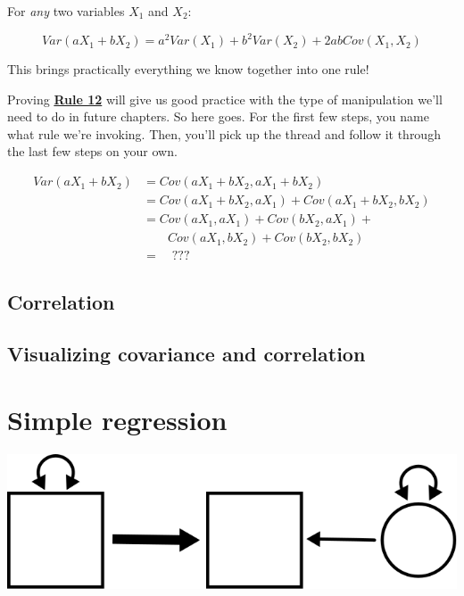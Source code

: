 \documentclass[
]{book}
\begin{document}
For \emph{any} two variables \(X_{1}\) and \(X_{2}\):

\[
Var(aX_{1} + bX_{2}) = 
    a^2Var(X_{1}) + b^2Var(X_{2}) + 2abCov(X_{1}, X_{2})
\]

This brings practically everything we know together into one rule!

Proving \protect\hyperlink{Rule12}{\textbf{Rule 12}} will give us good practice with the type of manipulation we'll need to do in future chapters. So here goes. For the first few steps, you name what rule we're invoking. Then, you'll pick up the thread and follow it through the last few steps on your own.

\begin{align}
Var(aX_{1} + bX_{2}) &= Cov(aX_{1} + bX_{2}, aX_{1} + bX_{2}) \\
    &= Cov(aX_{1} + bX_{2}, aX_{1}) + Cov(aX_{1} + bX_{2}, bX_{2}) \\
    &=  Cov(aX_{1}, aX_{1}) + 
        Cov(bX_{2}, aX_{1}) + \\
    &   \qquad Cov(aX_{1}, bX_{2}) + 
        Cov(bX_{2}, bX_{2}) \\
    &= \quad ???
\end{align}

\hypertarget{covariance-correlation}{%
\section{Correlation}\label{covariance-correlation}}

\hypertarget{covariance-visualizing}{%
\section{Visualizing covariance and correlation}\label{covariance-visualizing}}

\hypertarget{simple}{%
\chapter{Simple regression}\label{simple}}

\begin{center}\includegraphics{graphics/simple_regression} \end{center}
\end{document}
